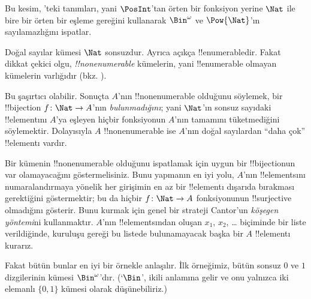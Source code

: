 



\begin{editorial}
  Bu kesim, 'teki tanımları, yani $\PosInt$'tan örten bir
  fonksiyon yerine $\Nat$ ile bire bir örten bir eşleme gereğini kullanarak
  $\Bin^\omega$ ve $\Pow{\Nat}$'ın sayılamazlığını ispatlar.
\end{editorial}

\begin{explain}
Doğal sayılar kümesi $\Nat$ sonsuzdur. Ayrıca açıkça !!{enumerable}{}dir.
Fakat dikkat çekici olgu, \emph{!!{nonenumerable}} kümelerin, yani
!!{enumerable} olmayan kümelerin varlığıdır
(bkz. ).

Bu şaşırtıcı olabilir. Sonuçta $A$'nın !!{nonenumerable} olduğunu söylemek,
bir !!{bijection} $f\colon\Nat\to A$'nın \emph{bulunmadığını}; yani
$\Nat$'ın sonsuz sayıdaki !!{element}{}ını $A$'ya eşleyen hiçbir fonksiyonun
$A$'nın tamamını tüketmediğini söylemektir. Dolayısıyla $A$
!!{nonenumerable} ise $A$'nın doğal sayılardan ``daha çok'' !!{element}{}ı
vardır.

Bir kümenin !!{nonenumerable} olduğunu ispatlamak için uygun bir
!!{bijection}{}un var olamayacağını göstermelisiniz. Bunu yapmanın en iyi yolu,
$A$'nın !!{element}s{}ını numaralandırmaya yönelik her girişimin en az bir
!!{element}{}ı dışarıda bırakması gerektiğini göstermektir; bu da hiçbir
$f\colon\Nat\to A$ fonksiyonunun !!{surjective} olmadığını gösterir. Bunu
kurmak için genel bir strateji Cantor'un \emph{köşegen yöntemi}ni
kullanmaktır. $A$'nın !!{element}s{}ından oluşan $x_1$, $x_2$, \dots{}
biçiminde bir liste verildiğinde, kuruluşu gereği bu listede bulunamayacak başka bir $A$
!!{element}{}ı kurarız.

Fakat bütün bunlar en iyi bir örnekle anlaşılır. İlk örneğimiz, bütün sonsuz
$0$ ve $1$ dizgilerinin kümesi $\Bin^\omega$'dır. (`$\Bin$', ikili anlamına
gelir ve onu yalnızca iki elemanlı $\{0,1\}$ kümesi olarak düşünebiliriz.)
\end{explain}


